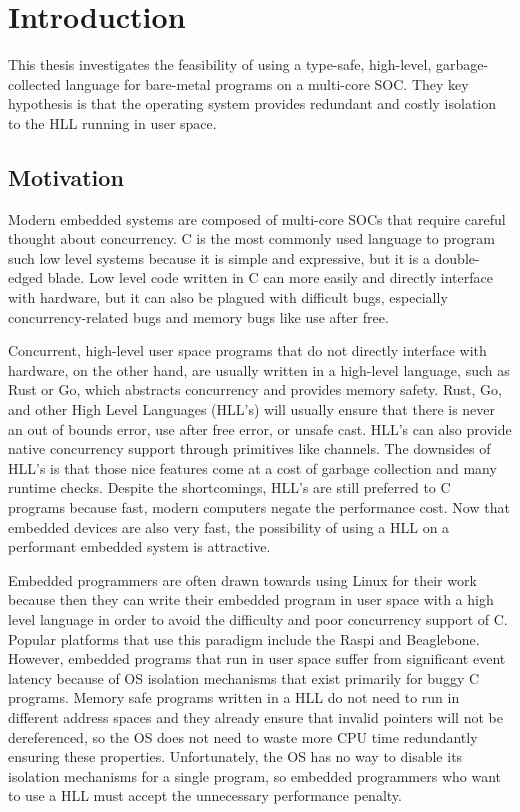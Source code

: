 
\chapter{Introduction}

This thesis investigates the feasibility of using a type-safe,
high-level, garbage-collected language for bare-metal programs
on a multi-core SOC. They key hypothesis is that the operating system
provides redundant and costly isolation to the HLL running in user space.

\section{Motivation}

Modern embedded systems are composed of multi-core SOCs that require
careful thought about concurrency. C is the
most commonly used language to program such low level systems because
it is simple and expressive, but it is
a double-edged blade. Low level code written in C can more easily and
directly interface with hardware, but it can also be plagued with
difficult bugs, especially concurrency-related bugs and memory bugs like
use after free.

Concurrent, high-level user space programs that do not directly interface with
hardware, on the other hand, are usually written in a
high-level language, such as Rust or Go, which abstracts concurrency
and provides memory safety. Rust, Go, and other High Level Languages (HLL's)
will usually ensure that there is never an out of bounds error, use
after free error, or unsafe cast. HLL's can also provide native concurrency
support through primitives like channels. The downsides of HLL's is that those
nice features come at a cost of garbage collection and many runtime checks.
Despite the shortcomings, HLL's are still preferred to C programs because fast,
modern computers negate the performance cost. Now that embedded devices are also very fast,
the possibility of using a HLL on a performant embedded system is attractive.

Embedded programmers are often drawn towards using Linux for their work
because then they can write their embedded program in user space with a
high level language in order to avoid the difficulty and poor concurrency
support of C. Popular platforms that use this paradigm include
the Raspi and Beaglebone. However, embedded programs that run in user space suffer
from significant event latency because of OS isolation mechanisms that exist primarily
for buggy C programs. Memory safe programs written in a HLL do not need to run
in different address spaces and they already ensure that invalid pointers will not
be dereferenced, so the OS does not need to waste more CPU time redundantly ensuring
these properties. Unfortunately, the OS has no way to disable its isolation mechanisms
for a single program, so embedded programmers who want to use a HLL must accept the unnecessary
performance penalty.

